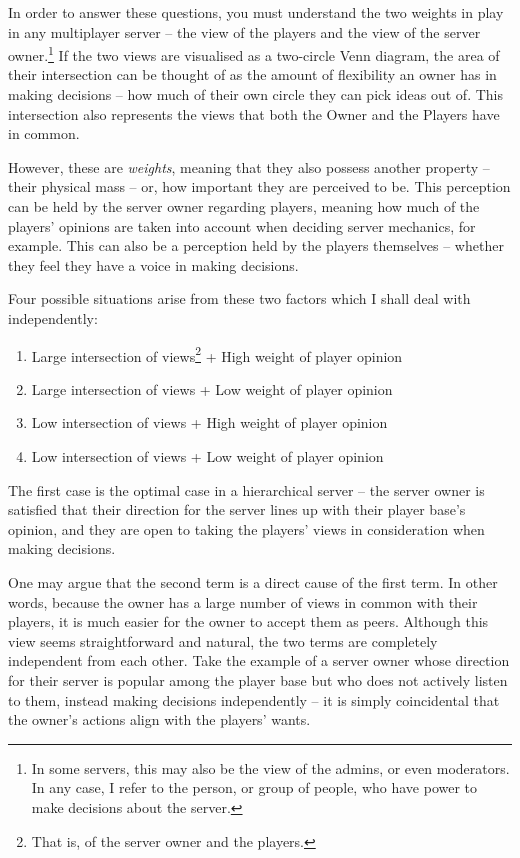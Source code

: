 In order to answer these questions, you must understand the two weights in play in any multiplayer server – the view of the players and the view of the server owner.\footnote{In some servers, this may also be the view of the admins, or even moderators. In any case, I refer to the person, or group of people, who have power to make decisions about the server.} If the two views are visualised as a two-circle Venn diagram, the area of their intersection can be thought of as the amount of flexibility an owner has in making decisions – how much of their own circle they can pick ideas out of. This intersection also represents the views that both the Owner and the Players have in common.

However, these are \emph{weights}, meaning that they also possess another property – their physical mass – or, how important they are perceived to be. This perception can be held by the server owner regarding players, meaning how much of the players’ opinions are taken into account when deciding server mechanics, for example. This can also be a perception held by the players themselves – whether they feel they have a voice in making decisions.

Four possible situations arise from these two factors which I shall deal with independently:\begin{enumerate}
    \item Large intersection of views\footnote{That is, of the server owner and the players.} + High weight of player opinion
    \item Large intersection of views + Low weight of player opinion
    \item Low intersection of views + High weight of player opinion
    \item Low intersection of views + Low weight of player opinion
\end{enumerate}
The first case is the optimal case in a hierarchical server – the server owner is satisfied that their direction for the server lines up with their player base’s opinion, and they are open to taking the players’ views in consideration when making decisions.

One may argue that the second term is a direct cause of the first term. In other words, because the owner has a large number of views in common with their players, it is much easier for the owner to accept them as peers. Although this view seems straightforward and natural, the two terms are completely independent from each other. Take the example of a server owner whose direction for their server is popular among the player base but who does not actively listen to them, instead making decisions independently – it is simply coincidental that the owner’s actions align with the players’ wants.

